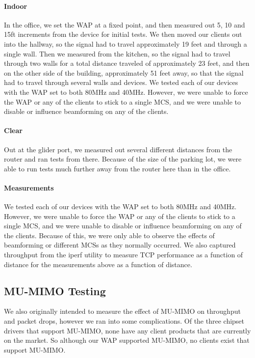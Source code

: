 \paragraph{Indoor}
In the office, we set the WAP at a fixed point, and then measured out 5, 10 and
15ft increments from the device for initial tests. We then moved our clients out
into the hallway, so the signal had to travel approximately 19 feet and through
a single wall. Then we measured from the kitchen, so the signal had to travel
through two walls for a total distance traveled of approximately 23 feet, and
then on the other side of the building, approximately 51 feet away, so that the
signal had to travel through several walls and devices. We tested each of our
devices with the WAP set to both 80MHz and 40MHz.  However, we were unable to
force the WAP or any of the clients to stick to a single MCS, and we were unable
to disable or influence beamforming on any of the clients.

\paragraph{Clear}
Out at the glider port, we measured out several different distances from the
router and ran tests from there. Because of the size of the parking lot, we were
able to run tests much further away from the router here than in the office.

\paragraph{Measurements}
We tested each of our devices with the WAP set to both 80MHz and 40MHz.
However, we were unable to force the WAP or any of the clients to stick to a
single MCS, and we were unable to disable or influence beamforming on any of the
clients. Because of this, we were only able to observe the effects of
beamforming or different MCSs as they normally occurred. We also captured throughput
from the iperf utility to measure TCP performance as a function of distance for the measurements
above as a function of distance.

\subsection{MU-MIMO Testing}

We also originally intended to measure the effect of MU-MIMO on
throughput and packet drops, however we ran into some
complications. Of the three chipset drivers that support MU-MIMO, none
have any client products that are currently on the market. So although
our WAP supported MU-MIMO, no clients exist that support MU-MIMO.

